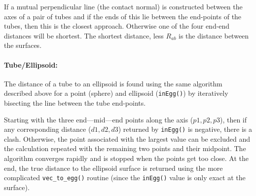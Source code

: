 {{{{{If a mutual perpendicular line (the contact normal) is constructed between the axes of a pair
of tubes and if the ends of this lie between the end-points of the tubes, then this is the
closest approach.   Otherwise one of the four end-end distances will be shortest.   The shortest
distance, less $R_{ab}$ is the distance between the surfaces.

\paragraph{Tube/Ellipsoid:\\}

The distance of a tube to an ellipsoid is found using the same algorithm described above
for a point (sphere) and ellipsoid ({\tt inEgg()}) by iteratively bisecting the line between the
tube end-points.

Starting with the three end---mid---end points along the axis ($p1,p2,p3$), then if any corresponding
distance ($d1,d2,d3$) returned by {\tt inEgg()} is negative, there is a clash.   Otherwise, the point
associated with the largest value can be excluded and the calculation repeated with the remaining
two points and their midpoint.   The algorithm converges rapidly and is stopped when the points
get too close.   At the end, the true distance to the ellipsoid surface is returned using the more
complicated {\tt vec\_to\_egg()} routine (since the {\tt inEgg()} value is only exact at the surface).

}}}}}

